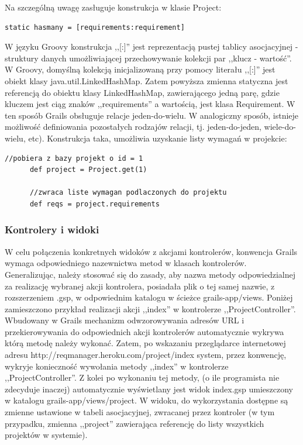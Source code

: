     Na szczególną uwagę zasługuje konstrukcja w klasie Project: 

    \begin{lstlisting}[caption={relacja jeden-do-wielu}, label={lst:oneToMany}]
      static hasmany = [requirements:requirement]
    \end{lstlisting}

    W języku Groovy konstrukcja ,,[:]'' jest reprezentacją pustej tablicy asocjacyjnej - struktury danych umożliwiającej przechowywanie kolekcji par ,,klucz - wartość''. W Groovy, domyślną kolekcją inicjalizowaną przy pomocy literału ,,[:]'' jest obiekt klasy java.util.LinkedHashMap. Zatem powyższa zmienna statyczna jest referencją do obiektu klasy LinkedHashMap, zawierającego jedną parę, gdzie kluczem jest ciąg znaków ,,requirements'' a wartością, jest klasa Requirement. W ten sposób Grails obsługuje relacje jeden-do-wielu. W analogiczny sposób, istnieje możliwość definiowania pozostałych rodzajów relacji, tj. jeden-do-jeden, wiele-do-wielu, etc). Konstrukcja taka, umożliwia uzyskanie listy wymagań w projekcie: 

    \begin{lstlisting}[caption={wymagania przypisane do projektu}, label={lst:requirements}]
      //pobiera z bazy projekt o id = 1
      def project = Project.get(1)

      //zwraca liste wymagan podlaczonych do projektu
      def reqs = project.requirements 
    \end{lstlisting}
    
      
    \subsubsection{Kontrolery i widoki}

    W celu połączenia konkretnych widoków z akcjami kontrolerów, konwencja Grails wymaga odpowiedniego nazewnictwa metod w klasach kontrolerów. Generalizując, należy stosować się do zasady, aby nazwa metody odpowiedzialnej za realizację wybranej akcji kontrolera, posiadała plik o tej samej nazwie, z rozszerzeniem .gsp, w odpowiednim katalogu w ścieżce grails-app/views. Poniżej zamieszczono przykład realizacji akcji ,,index'' w kontrolerze ,,ProjectController''. Wbudowany w Grails mechanizm odwzorowywania adresów URL i przekierowywania do odpowiednich akcji kontrolerów automatycznie wykrywa którą metodę należy wykonać. Zatem, po wskazaniu przeglądarce internetowej adresu http://reqmanager.heroku.com/project/index system, przez konwencję, wykryje konieczność wywołania metody ,,index'' w kontrolerze ,,ProjectController''. Z kolei po wykonaniu tej metody, (o ile programista nie zdecyduje inaczej) automatycznie wyświetlany jest widok index.gsp umieszczony w katalogu grails-app/views/project. W widoku, do wykorzystania dostępne są zmienne ustawione w tabeli asocjacyjnej, zwracanej przez kontroler (w tym przypadku, zmienna ,,project'' zawierająca referencję do listy wszystkich projektów w systemie). 


